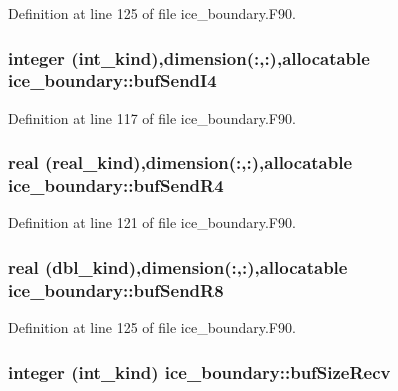 Definition at line 125 of file ice\_\-boundary.F90.\hypertarget{namespaceice__boundary_a2554f422dd4f1b67e0affadd17f11069}{
\subsubsection[{bufSendI4}]{\setlength{\rightskip}{0pt plus 5cm}integer (int\_\-kind),dimension(:,:),allocatable {\bf ice\_\-boundary::bufSendI4}}}
\label{namespaceice__boundary_a2554f422dd4f1b67e0affadd17f11069}


Definition at line 117 of file ice\_\-boundary.F90.\hypertarget{namespaceice__boundary_a78f43d9e66420f40a9140762b7b69427}{
\subsubsection[{bufSendR4}]{\setlength{\rightskip}{0pt plus 5cm}real (real\_\-kind),dimension(:,:),allocatable {\bf ice\_\-boundary::bufSendR4}}}
\label{namespaceice__boundary_a78f43d9e66420f40a9140762b7b69427}


Definition at line 121 of file ice\_\-boundary.F90.\hypertarget{namespaceice__boundary_a6fd3fc7d61b1eb43afbd050a0d073c90}{
\subsubsection[{bufSendR8}]{\setlength{\rightskip}{0pt plus 5cm}real (dbl\_\-kind),dimension(:,:),allocatable {\bf ice\_\-boundary::bufSendR8}}}
\label{namespaceice__boundary_a6fd3fc7d61b1eb43afbd050a0d073c90}


Definition at line 125 of file ice\_\-boundary.F90.\hypertarget{namespaceice__boundary_a4faa8fff704b4598309e0cdb8a777032}{
\subsubsection[{bufSizeRecv}]{\setlength{\rightskip}{0pt plus 5cm}integer (int\_\-kind) {\bf ice\_\-boundary::bufSizeRecv}}}
\label{namespaceice__boundary_a4faa8fff704b4598309e0cdb8a777032}


